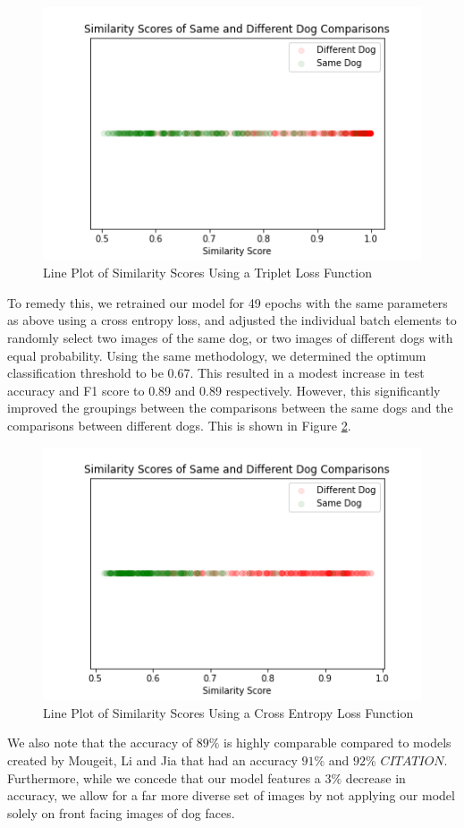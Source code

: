 \documentclass{article}
\begin{document}
\begin{figure}[h]
\centering
	\includegraphics[scale=0.7]{final-report-images/triplet_lineplot.png}
\caption{Line Plot of Similarity Scores Using a Triplet Loss Function}
\label{fig:x triplet lineplot}
\end{figure}
\noindent To remedy this, we retrained our model for 49 epochs with the same parameters as above using a cross entropy loss, and adjusted the individual batch elements to randomly select two images of the same dog, or two images of different dogs with equal probability.  Using the same methodology, we determined the optimum classification threshold to be 0.67.  This resulted in a modest increase in test accuracy and F1 score to 0.89 and 0.89 respectively.  However, this significantly improved the groupings between the comparisons between the same dogs and the comparisons between different dogs. This is shown in Figure \ref{fig:x triplet lineplot}. 

\begin{figure}[h]
\centering
	\includegraphics[scale=0.7]{final-report-images/crossentropy_lineplot.png}
\caption{Line Plot of Similarity Scores Using a Cross Entropy Loss Function}
\label{fig:x triplet lineplot}
\end{figure}
\noident We also note that the accuracy of $89\%$ is highly comparable compared to models created by Mougeit, Li and Jia that had an accuracy $91\%$ and $92\%$ \(CITATION\).  Furthermore, while we concede that our model features a $3\%$ decrease in accuracy, we allow for a far more diverse set of images by not applying our model solely on front facing images of dog faces.
\end{document}
